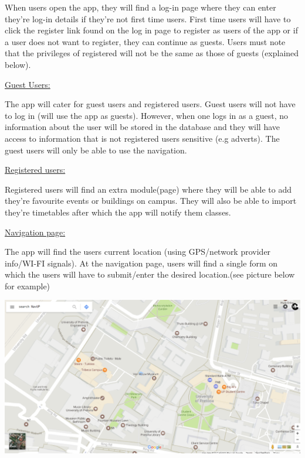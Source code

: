 \documentclass[12pt]{article}
\begin{document}
{\raggedright

When users open the app, they will find a log-in page where they can enter they're log-in details if they're not first time users. First time users will have to click the register link found on the log in page to register as users of the app or if a user does not want to register, they can continue as guests. Users must note that the privileges of registered will not be the same as those of guests (explained below). 

}



{\raggedright

\uline{Guest Users:}}



{\raggedright

The app will cater for guest users and registered users. Guest users will not have to log in (will use the app as guests). However, when one logs in as a guest, no information about the user will be stored in the database and they will have access to information that is not registered users sensitive (e.g adverts). The guest users will only be able to use the navigation.

}



{\raggedright



}



{\raggedleft

\uline{Registered users:}}



{\raggedright

Registered users will find an extra module(page) where they will be able to add they're favourite events or buildings on campus. They will also be able to import they're timetables after which the app will notify them classes.

}



{\raggedright

\uline{Navigation page:}}



The app will find the users current location (using GPS/network provider info/WI-FI signals). At the navigation page, users will find a single form on which the users will have to submit/enter the desired location.(see picture below for example)



\includegraphics{1.png}
\end{document}
